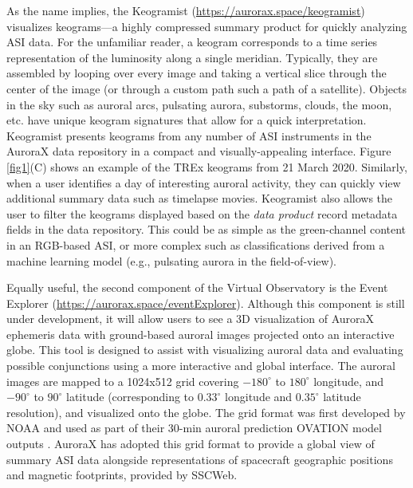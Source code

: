 \documentclass[utf8]{FrontiersinHarvard} %
\begin{document}
As the name implies, the Keogramist (\url{https://aurorax.space/keogramist}) visualizes keograms---a highly compressed summary product for quickly analyzing ASI data. For the unfamiliar reader, a keogram corresponds to a time series representation of the luminosity along a single meridian. Typically, they are assembled by looping over every image and taking a vertical slice through the center of the image (or through a custom path such a path of a satellite). Objects in the sky such as auroral arcs, pulsating aurora, substorms, clouds, the moon, etc. have unique keogram signatures that allow for a quick interpretation. Keogramist presents keograms from any number of ASI instruments in the AuroraX data repository in a compact and visually-appealing interface. Figure \ref{fig1}(C) shows an example of the TREx keograms from 21 March 2020. Similarly, when a user identifies a day of interesting auroral activity, they can quickly view additional summary data such as timelapse movies. Keogramist also allows the user to filter the keograms displayed based on the \textit{data product} record metadata fields in the data repository. This could be as simple as the green-channel content in an RGB-based ASI, or more complex such as classifications derived from a machine learning model (e.g., pulsating aurora in the field-of-view).

Equally useful, the second component of the Virtual Observatory is the Event Explorer (\url{https://aurorax.space/eventExplorer}). Although this component  is still under development, it will allow users to see a 3D visualization of AuroraX ephemeris data with ground-based auroral images projected onto an interactive globe. This tool is designed to assist with visualizing auroral data and evaluating possible conjunctions using a more interactive and global interface. The auroral images are mapped to a 1024x512 grid covering $-180^\circ$ to $180^\circ$ longitude, and $-90^\circ$ to $90^\circ$ latitude (corresponding to $0.33^\circ$ longitude and $0.35^\circ$ latitude resolution), and visualized onto the globe. The grid format was first developed by NOAA and used as part of their 30-min auroral prediction OVATION model outputs \citep{Newell2010, Machol2012}. AuroraX has adopted this grid format to provide a global view of summary ASI data alongside representations of spacecraft geographic positions and magnetic footprints, provided by SSCWeb.
\end{document}

